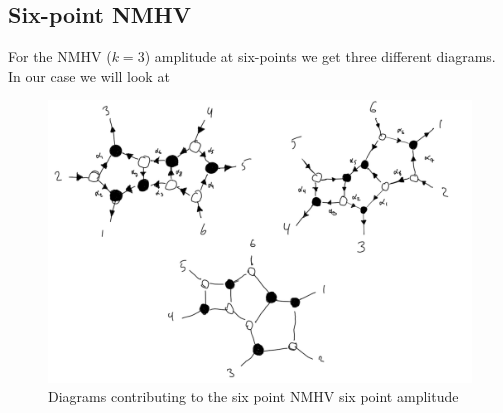 \documentclass[letter,11pt]{article}
\begin{document}
\subsection{Six-point NMHV}
For the NMHV ($k=3$) amplitude at six-points we get three different diagrams. In our case we will look at
\begin{figure}[H]
	\centering
	\includegraphics[width=0.9\linewidth]{nmhv}
	\caption[]{Diagrams contributing to the six point NMHV six point amplitude}
	\label{fig:44}
\end{figure}
\end{document}
